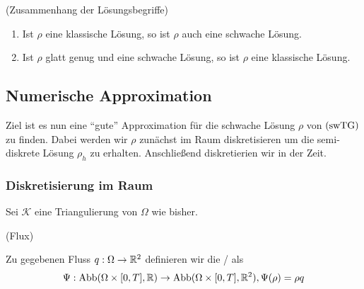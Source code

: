 \begin{Lemma}(Zusammenhang der Lösungsbegriffe)
	
	\begin{enumerate}
		\item Ist $ \rho $ eine klassische Lösung, so ist $ \rho $ auch eine schwache Lösung.
		\item Ist $ \rho $ glatt genug und eine schwache Lösung, so ist $ \rho $ eine klassische Lösung. 
	\end{enumerate}
\end{Lemma}

\subsection{Numerische Approximation}
Ziel ist es nun eine \enquote{gute} Approximation für die schwache Lösung $ \rho $ von $ \operatorname{(swTG)} $ zu finden. Dabei werden wir $ \rho $ zunächst im Raum diskretisieren um die semi-diskrete Lösung $ \rho_h $ zu erhalten. Anschließend diskretierien wir in der Zeit.

\subsubsection{Diskretisierung im Raum}
 Sei $ \mathcal{K} $ eine Triangulierung von $ \Omega $ wie bisher. 
\begin{define}(Flux)
	
	Zu gegebenen Fluss $ q:\Omega \to \mathbb{R}^2 $ definieren wir die / als
	\[ \Psi: \operatorname{Abb}(\Omega \times [0,T], \mathbb{R}) \to \operatorname{Abb}(\Omega \times [0,T], \mathbb{R}^2), \Psi(\rho) = \rho q \]
\end{define}

